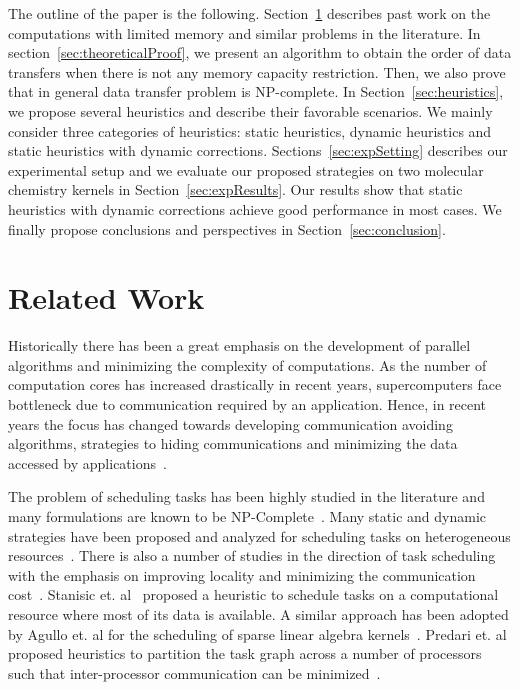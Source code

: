 \documentclass[sigconf]{acmart}
\begin{document}
	The outline of the paper is the following. Section~\ref{sec:relatedWork} describes past work on the computations with limited memory and similar problems in the literature. In section~\ref{sec:theoreticalProof}, we present an algorithm to obtain the order of data transfers when there is not any memory capacity restriction. Then, we also prove that in general data transfer problem is NP-complete. In Section~\ref{sec:heuristics}, we propose several heuristics and describe their favorable scenarios. We mainly consider three categories of heuristics: static heuristics, dynamic heuristics and static heuristics with dynamic corrections. Sections~\ref{sec:expSetting} describes our experimental setup and we evaluate our proposed strategies on two molecular chemistry kernels in Section~\ref{sec:expResults}. Our results show that static heuristics with dynamic corrections achieve good performance in most cases. We finally propose conclusions and perspectives in Section~\ref{sec:conclusion}.
	
	\section{Related Work}
	\label{sec:relatedWork}
	
	Historically there has been a great emphasis on the development of parallel algorithms and minimizing the complexity of computations. As the number of computation cores has increased drastically in recent years, supercomputers face bottleneck due to communication required by an application. Hence, in recent years the focus has changed towards developing communication avoiding algorithms, strategies to hiding communications and minimizing the data accessed by applications~\cite{yelick2016}. 
	
	
	The problem of scheduling tasks has been highly studied in the literature and many formulations are known to be NP-Complete~\cite{GareyJohnson}. Many static and dynamic strategies have been proposed and analyzed for scheduling tasks on heterogeneous resources~\cite{heft-Topcuoglu,hipc16multiresource,ipdps16starpu}. There is also a number of studies in the direction of task scheduling with the emphasis on improving locality and minimizing the communication cost~\cite{starpu,heft-Topcuoglu}. Stanisic et. al~\cite{luka-dmdar} proposed a heuristic to schedule tasks on a computational resource where most of its data is available. A similar approach has been adopted by Agullo et. al for the scheduling of sparse linear algebra kernels~\cite{agullo_fmm}. Predari et. al proposed heuristics to partition the task graph across a number of processors such that inter-processor communication can be minimized~\cite{predari:tel-01518956}.
	
\end{document}
